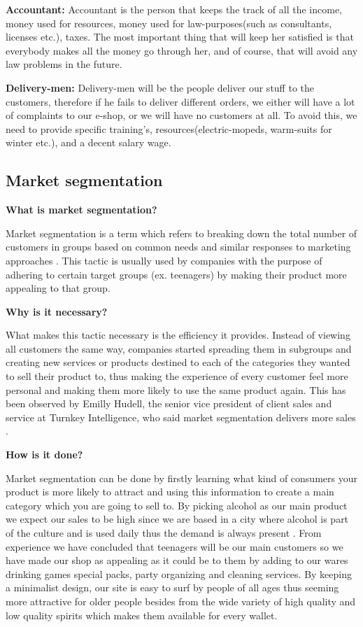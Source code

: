 \documentclass[12p]{article}
\begin{document}
\textbf{Accountant:}
Accountant is the person that keeps the track of all the income, money used for resources, money used for law-purposes(such as consultants, licenses etc.), taxes. The most important thing that will keep her satisfied is that everybody makes all the money go through her, and of course, that will avoid any law problems in the future.

\textbf{Delivery-men:}
Delivery-men will be the people deliver our stuff to the customers, therefore if he fails to deliver different orders, we either will have a lot of complaints to our e-shop, or we will have no customers at all. To avoid this, we need to provide specific training's, resources(electric-mopeds, warm-suits for winter etc.), and a decent salary wage.

\newpage


\subsection{Market segmentation} \label{MarketSegmentation}

\textbf{What is market segmentation?}

Market segmentation is a term which refers to breaking down the total number of customers in groups based on common needs and similar responses to marketing approaches \cite{MarketSegmentation}. This tactic is usually used by companies with the purpose of adhering to certain target groups (ex. teenagers) by making their product more appealing to that group.

\textbf{Why is it necessary?}

What makes this tactic necessary is the efficiency it provides. Instead of viewing all customers the same way, companies started spreading them in subgroups and creating new services or products destined to each of the categories they wanted to sell their product to, thus making the experience of every customer feel more personal and making them more likely to use the same product again. This has been observed by Emilly Hudell, the senior vice president of client sales and service at Turnkey Intelligence, who said market segmentation delivers more sales \cite{MarketSegmentationEfficieny}.

\textbf{How is it done?}

Market segmentation can be done by firstly learning what kind of consumers your product is more likely to attract and using this information to create a main category which you are going to sell to. By picking alcohol as our main product we expect our sales to be high since we are based in a city where alcohol is part of the culture and is used daily thus the demand is always present \cite{DanesBinge}. From experience we have concluded that teenagers will be our main customers so we have made our shop as appealing as it could be to them by adding to our wares drinking games special packs, party organizing and cleaning services. By keeping a minimalist design, our site is easy to surf by people of all ages thus seeming more attractive for older people besides from the wide variety of high quality and low quality spirits which makes them available for every wallet.
\end{document}
